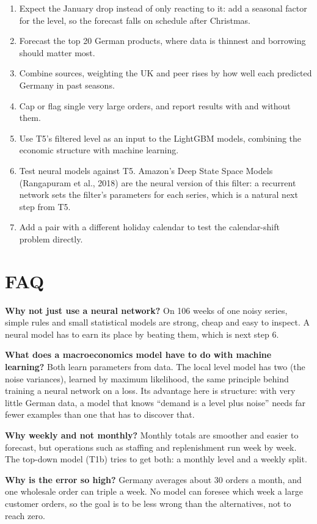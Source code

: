 \documentclass[11pt]{article}
\begin{document}
\begin{enumerate}
\item Expect the January drop instead of only reacting to it: add a seasonal factor for the level, so the
forecast falls on schedule after Christmas.
\item Forecast the top 20 German products, where data is thinnest and borrowing should matter most.
\item Combine sources, weighting the UK and peer rises by how well each predicted Germany in past seasons.
\item Cap or flag single very large orders, and report results with and without them.
\item Use T5's filtered level as an input to the LightGBM models, combining the economic structure with
machine learning.
\item Test neural models against T5. Amazon's Deep State Space Models (Rangapuram et al., 2018) are the
neural version of this filter: a recurrent network sets the filter's parameters for each series, which is
a natural next step from T5.
\item Add a pair with a different holiday calendar to test the calendar-shift problem directly.
\end{enumerate}

\section{FAQ}

\textbf{Why not just use a neural network?} On 106 weeks of one noisy series, simple rules and small
statistical models are strong, cheap and easy to inspect. A neural model has to earn its place by beating
them, which is next step 6.

\textbf{What does a macroeconomics model have to do with machine learning?} Both learn parameters from
data. The local level model has two (the noise variances), learned by maximum likelihood, the same
principle behind training a neural network on a loss. Its advantage here is structure: with very little
German data, a model that knows ``demand is a level plus noise'' needs far fewer examples than one that
has to discover that.

\textbf{Why weekly and not monthly?} Monthly totals are smoother and easier to forecast, but operations
such as staffing and replenishment run week by week. The top-down model (T1b) tries to get both: a
monthly level and a weekly split.

\textbf{Why is the error so high?} Germany averages about 30 orders a month, and one wholesale order can
triple a week. No model can foresee which week a large customer orders, so the goal is to be less wrong
than the alternatives, not to reach zero.
\end{document}
